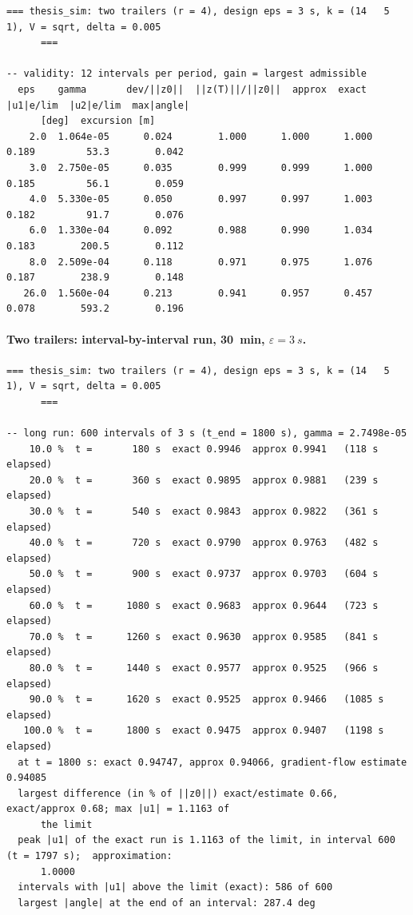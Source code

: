 {\scriptsize\begin{verbatim}
=== thesis_sim: two trailers (r = 4), design eps = 3 s, k = (14   5   1), V = sqrt, delta = 0.005
      ===

-- validity: 12 intervals per period, gain = largest admissible
  eps    gamma       dev/||z0||  ||z(T)||/||z0||  approx  exact   |u1|e/lim  |u2|e/lim  max|angle|
      [deg]  excursion [m]
    2.0  1.064e-05      0.024        1.000      1.000      1.000     0.189         53.3        0.042
    3.0  2.750e-05      0.035        0.999      0.999      1.000     0.185         56.1        0.059
    4.0  5.330e-05      0.050        0.997      0.997      1.003     0.182         91.7        0.076
    6.0  1.330e-04      0.092        0.988      0.990      1.034     0.183        200.5        0.112
    8.0  2.509e-04      0.118        0.971      0.975      1.076     0.187        238.9        0.148
   26.0  1.560e-04      0.213        0.941      0.957      0.457     0.078        593.2        0.196
\end{verbatim}}

\paragraph{Two trailers: interval-by-interval run, \SI{30}{min}, $\varepsilon=\SI{3}{s}$.}

{\scriptsize\begin{verbatim}
=== thesis_sim: two trailers (r = 4), design eps = 3 s, k = (14   5   1), V = sqrt, delta = 0.005
      ===

-- long run: 600 intervals of 3 s (t_end = 1800 s), gamma = 2.7498e-05
    10.0 %  t =       180 s  exact 0.9946  approx 0.9941   (118 s elapsed)
    20.0 %  t =       360 s  exact 0.9895  approx 0.9881   (239 s elapsed)
    30.0 %  t =       540 s  exact 0.9843  approx 0.9822   (361 s elapsed)
    40.0 %  t =       720 s  exact 0.9790  approx 0.9763   (482 s elapsed)
    50.0 %  t =       900 s  exact 0.9737  approx 0.9703   (604 s elapsed)
    60.0 %  t =      1080 s  exact 0.9683  approx 0.9644   (723 s elapsed)
    70.0 %  t =      1260 s  exact 0.9630  approx 0.9585   (841 s elapsed)
    80.0 %  t =      1440 s  exact 0.9577  approx 0.9525   (966 s elapsed)
    90.0 %  t =      1620 s  exact 0.9525  approx 0.9466   (1085 s elapsed)
   100.0 %  t =      1800 s  exact 0.9475  approx 0.9407   (1198 s elapsed)
  at t = 1800 s: exact 0.94747, approx 0.94066, gradient-flow estimate 0.94085
  largest difference (in % of ||z0||) exact/estimate 0.66, exact/approx 0.68; max |u1| = 1.1163 of
      the limit
  peak |u1| of the exact run is 1.1163 of the limit, in interval 600 (t = 1797 s);  approximation:
      1.0000
  intervals with |u1| above the limit (exact): 586 of 600
  largest |angle| at the end of an interval: 287.4 deg
\end{verbatim}}


